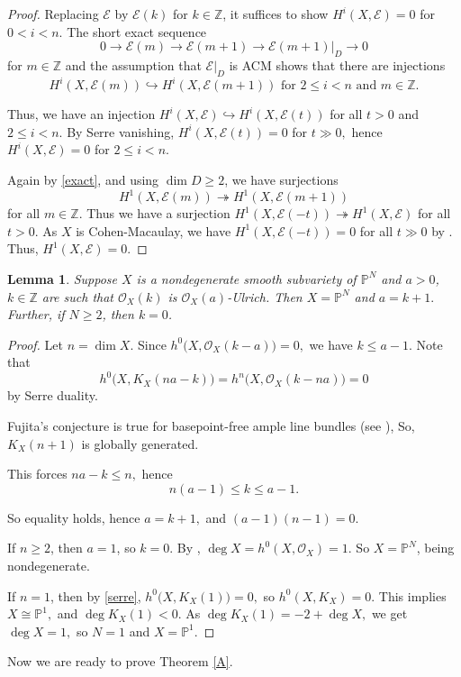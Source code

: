 \documentclass[11pt,letterpaper]{amsart}
\newtheorem{lemma}{Lemma}[section]
\begin{document}
\begin{proof}
Replacing $\mathcal{E}$ by $\mathcal{E}(k)$ for $k\in \mathbb Z$, it suffices to show $H^i(X,\mathcal{E})=0$
for $0<i<n.$ The short exact sequence
\begin{equation}\label{exact}
0\to \mathcal{E}(m)\to \mathcal{E}(m+1)\to \mathcal{E}(m+1)|_D\to 0
\end{equation}
for $m\in\mathbb Z$ and the assumption that $\mathcal{E}|_D$ is ACM
shows that there are injections
\[
H^i(X,\mathcal{E}(m))
\hookrightarrow
H^i(X,\mathcal{E}(m+1))
\text{ for }
2\le i<n
\text{ and } m\in\mathbb{Z}.
\]

Thus, we have an injection $H^i(X,\mathcal{E})
\hookrightarrow
H^i(X,\mathcal{E}(t))$
for all $t> 0$ and $2\le i<n.$ By Serre vanishing, $H^i(X,\mathcal{E}(t))=0$
for $t\gg 0,$
hence $H^i(X,\mathcal{E})=0$
for $2\le i<n.$

Again by \eqref{exact}, and using $\dim D\ge 2$, we have surjections
\[
H^1(X,\mathcal{E}(m))
\twoheadrightarrow
H^1(X,\mathcal{E}(m+1))
\]
for all $m\in\mathbb Z$. Thus we have a surjection $H^1(X,\mathcal{E}(-t))
\twoheadrightarrow
H^1(X,\mathcal{E})$
for all $t> 0$. As $X$ is Cohen-Macaulay, we have $H^1(X,\mathcal{E}(-t))=0$
for all $t\gg 0$ by
\cite[Theorem III.7.6]{hartshorne2013algebraic}.
Thus, $H^1(X,\mathcal{E})=0.$
\end{proof}
\begin{lemma}\label{easy}
Suppose $X$ is a nondegenerate smooth subvariety of $\mathbb{P}^N$ and
$a>0$, $k\in \mathbb{Z}$ are such that $\mathcal{O}_X(k)$
is $\mathcal{O}_X(a)$-Ulrich. Then $X=\mathbb{P}^N$ and $a=k+1.$
Further, if $N\ge 2$, then $k=0$.
\end{lemma}
\begin{proof}
Let $n=\dim X.$ Since $h^0\bigl(X,\mathcal{O}_X(k-a)\bigr)=0,$
we have $k\le a-1.$ Note that
\begin{equation}\label{serre}
h^0\bigl(X,K_X(na-k)\bigr)
=
h^n\bigl(X,\mathcal{O}_X(k-na)\bigr)
=
0
\end{equation}
by Serre duality.

Fujita's conjecture is true for basepoint-free ample line bundles
(see \cite[\S 5.6]{kollar1997singularities}),
So, $K_X(n+1)$
is globally generated.

This forces $na-k\le n,$
hence
\[
n(a-1)\le k\le a-1.
\]

So equality holds, hence $a=k+1,$ and $(a-1)(n-1)=0.$

If $n\ge 2$, then $a=1$, so $k=0$.
By \cite[\S 2, (2.1)]{beauville2018introduction}, $
\deg X=h^0(X,\mathcal{O}_X)=1.$ So $X=\mathbb{P}^N$, being nondegenerate.

If $n=1$, then by \eqref{serre}, $h^0\bigl(X,K_X(1)\bigr)=0,$
so $h^0(X,K_X)=0.$ This implies $X\cong \mathbb{P}^1,$
and $\deg K_X(1)<0.$ As $\deg K_X(1)=-2+\deg X,$
we get $\deg X=1,$
so $N=1$ and $X=\mathbb{P}^1$.
\end{proof}
Now we are ready to prove Theorem \ref{A}.
\end{document}
